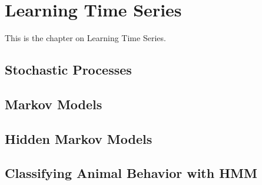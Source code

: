 \documentclass[MachineLearning]{subfiles}
\begin{document}

\section{Learning Time Series}
This is the chapter on Learning Time Series.
\subsection{Stochastic Processes}
\subsection{Markov Models}
\subsection{Hidden Markov Models}
\subsection{Classifying Animal Behavior with HMM}
\end{document}
